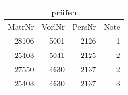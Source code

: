 {\begin{tabular}{|r|r|r|r|}
  \hline
  \multicolumn{4}{|c|}{prüfen}\\
  \hline
  MatrNr & VorlNr & PersNr & Note\\
  \hline\hline
  28106 & 5001 & 2126 & 1\\
  25403 & 5041 & 2125 & 2\\
  27550 & 4630 & 2137 & 2\\
  25403 & 4630 & 2137 & 3\\
  \hline
\end{tabular}}
